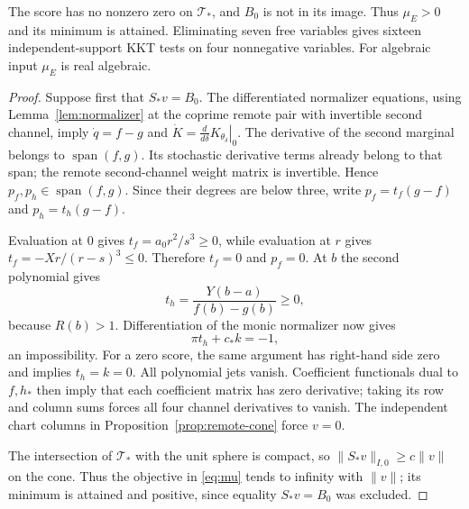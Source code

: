 \begin{lemma}\label{lem:mu-positive}
The score has no nonzero zero on $\mathcal T_*$, and $B_0$ is not in
its image. Thus $\mu_E>0$ and its minimum is attained. Eliminating seven
free variables gives sixteen independent-support KKT tests on four
nonnegative variables. For algebraic input $\mu_E$ is real algebraic.
\end{lemma}
\begin{proof}
Suppose first that $S_*v=B_0$. The differentiated normalizer equations,
using Lemma~\ref{lem:normalizer} at the coprime remote pair with invertible
second channel, imply $\dot q=f-g$ and
$\dot K=\left.\frac{d}{d\delta}K_{\theta_\delta}\right|_0$.
The derivative of the second marginal belongs to
$\operatorname{span}(f,g)$. Its stochastic derivative terms already
belong to that span; the remote second-channel weight matrix is
invertible. Hence $p_f,p_h\in\operatorname{span}(f,g)$. Since their
degrees are below three, write
$p_f=t_f(g-f)$ and $p_h=t_h(g-f)$.

Evaluation at $0$ gives $t_f=a_0r^2/s^3\ge0$, while evaluation at $r$
gives $t_f=-Xr/(r-s)^3\le0$. Therefore $t_f=0$ and $p_f=0$.
At $b$ the second polynomial gives
\[
 t_h=\frac{Y(b-a)}{f(b)-g(b)}\ge0,
\]
because $R(b)>1$. Differentiation of the monic normalizer now gives
\begin{equation}\label{eq:wall-obstruction}
 \pi t_h+c_*k=-1,
\end{equation}
an impossibility. For a zero score, the same argument has right-hand
side zero and implies $t_h=k=0$. All polynomial jets vanish.
Coefficient functionals dual to $f,h_*$ then imply that each coefficient
matrix has zero derivative; taking its row and column sums forces all
four channel derivatives to vanish. The independent chart columns in
Proposition~\ref{prop:remote-cone} force $v=0$.

The intersection of $\mathcal T_*$ with the unit sphere is compact,
so $\|S_*v\|_{I,0}\ge c\|v\|$ on the cone. Thus the objective in
\eqref{eq:mu} tends to infinity with $\|v\|$; its minimum is attained
and positive, since equality $S_*v=B_0$ was excluded.


\end{proof}

